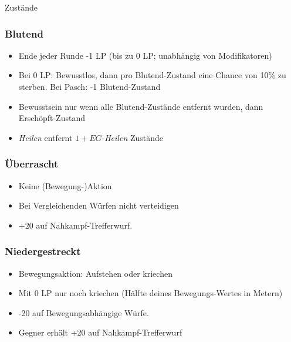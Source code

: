\documentclass{article}
\begin{document}
\begin{multicols*}{3}
\begin{slsframe}{Zustände}
    \subsubsection*{Blutend}
        \begin{itemize}%
            \item Ende jeder Runde -1 LP (bis zu 0 LP; unabhängig von Modifikatoren)
            \item Bei 0 LP: Bewusstlos, dann pro Blutend-Zustand eine Chance von 10\% zu sterben. Bei Pasch: -1 Blutend-Zustand
            \item Bewusstsein nur wenn alle Blutend-Zustände entfernt wurden, dann Erschöpft-Zustand
            \item \textit{Heilen} entfernt $1 + EG$-\textit{Heilen} Zustände
        \end{itemize}        

    \subsubsection*{Überrascht}
        \begin{itemize}%
            \item Keine (Bewegung-)Aktion 
            \item Bei Vergleichenden Würfen nicht verteidigen
            \item +20 auf Nahkampf-Trefferwurf.
        \end{itemize}   

    \subsubsection*{Niedergestreckt}
        \begin{itemize}%
            \item Bewegungsaktion: Aufstehen oder kriechen 
            \item Mit 0 LP nur noch kriechen (Hälfte deines Bewegungs-Wertes in Metern)
            \item -20 auf Bewegungsabhängige Würfe.
            \item Gegner erhält +20 auf Nahkampf-Trefferwurf
        \end{itemize}   
        


\end{slsframe}
\end{multicols*}
\end{document}
